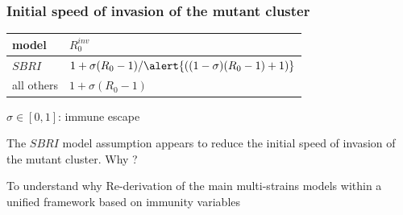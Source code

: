 \documentclass{beamer}
\begin{document}
\begin{frame}
  \frametitle{Initial speed of invasion of the mutant cluster}
 
  \begin{center}
    \begin{tabular}{|l|l|}
      \hline
      model & $R_0^{inv}$ \\
      \hline
      $SBRI$ & $1 + \sigma(R_0 -1)/\alert{((1-\sigma) (R_0-1) +1)}$ \\
      \hline
      all others & $1 + \sigma(R_0 -1)$\\
      \hline
    \end{tabular}
  \end{center}

$\sigma \in [0,1]$: immune escape


  \begin{block}{}
    The $SBRI$ model assumption appears to reduce the initial speed of
    invasion of the mutant cluster.  \alert{Why ?}
  \end{block}

  \pause
  \begin{alertblock}{To understand why}
    Re-derivation of the main multi-strains models within a unified
    framework based on immunity variables
  \end{alertblock}
\end{frame}
\end{document}

